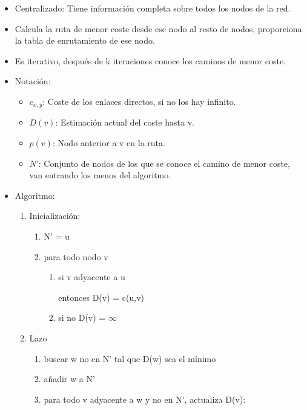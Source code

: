 \documentclass[12pt, twoside, openright]{report} %
\begin{document}
\begin{itemize}
	\item Centralizado: Tiene información completa sobre todos los nodos de
	      la red.
	\item Calcula la ruta de menor coste desde ese nodo al resto de nodos,
	      proporciona la tabla de enrutamiento de ese nodo.
	\item Es iterativo, después de k iteraciones conoce los caminos de menor
	      coste.
	\item Notación:

	      \begin{itemize}
		      \item \(c_{x,y}\): Coste de los enlaces directos, si no los hay
		            infinito.
		      \item \(D(v)\): Estimación actual del coste hasta v.
		      \item \(p(v)\): Nodo anterior a v en la ruta.
		      \item \(N’\): Conjunto de nodos de los que se conoce el camino de
		            menor coste, van entrando los menos del algoritmo.
	      \end{itemize}
	      \pagebreak
	\item Algoritmo:
	      \begin{enumerate}
		      \item Inicialización:
		            \begin{enumerate}
			            \item N' = {u}
			            \item para todo nodo v
			                  \begin{enumerate}
				                  \item si v adyacente a u

				                        entonces D(v) = c(u,v)
				                  \item si no D(v) = $\infty$
			                  \end{enumerate}
		            \end{enumerate}
		      \item Lazo
		            \begin{enumerate}
			            \item buscar w no en N' tal que D(w) sea el mínimo
			            \item añadir w a N'
			            \item para todo v adyacente a w y no en N', actualiza D(v):


\end{enumerate}
\end{enumerate}
\end{itemize}
\end{document}
